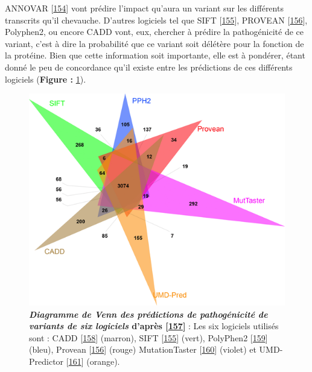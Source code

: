 \documentclass[12pt,a4paper,twoside]{ugathesis}
\theoremstyle{definition}
\theoremstyle{definition}
\theoremstyle{definition}
\theoremstyle{remark}
\begin{document}
\begin{enumerate}
\begin{enumerate}
    ANNOVAR {[}\protect\hyperlink{ref-Wang2010}{154}{]} vont prédire
    l'impact qu'aura un variant sur les différents transcrits qu'il
    chevauche. D'autres logiciels tel que SIFT
    {[}\protect\hyperlink{ref-Kumar2009}{155}{]}, PROVEAN
    {[}\protect\hyperlink{ref-Choi2012}{156}{]}, Polyphen2, ou encore
    CADD vont, eux, chercher à prédire la pathogénicité de ce variant,
    c'est à dire la probabilité que ce variant soit délétère pour la
    fonction de la protéine. Bien que cette information soit importante,
    elle est à pondérer, étant donné le peu de concordance qu'il existe
    entre les prédictions de ces différents logiciels (\textbf{Figure :}
    \ref{fig:pictvennpred}).
  \end{enumerate}
\end{enumerate}

\begin{figure}

{\centering \includegraphics[scale=.7]{figure/venn_Diag_patho_pred} 

}

\caption[Diagramme de Venn des prédictions de pathogénicité de variants de six logiciels]{\textbf{\emph{Diagramme de Venn des prédictions de
pathogénicité de variants de six logiciels} d'après
{[}\protect\hyperlink{ref-Salgado2016}{157}{]}} : Les six logiciels
utilisés sont : CADD {[}\protect\hyperlink{ref-Kircher2014}{158}{]}
(marron), SIFT {[}\protect\hyperlink{ref-Kumar2009}{155}{]} (vert),
PolyPhen2 {[}\protect\hyperlink{ref-Adzhubei2010}{159}{]} (bleu),
Provean {[}\protect\hyperlink{ref-Choi2012}{156}{]} (rouge)
MutationTaster {[}\protect\hyperlink{ref-Schwarz2010}{160}{]} (violet)
et UMD-Predictor {[}\protect\hyperlink{ref-Salgado2016a}{161}{]}
(orange).}\label{fig:pictvennpred}
\end{figure}
\end{document}
